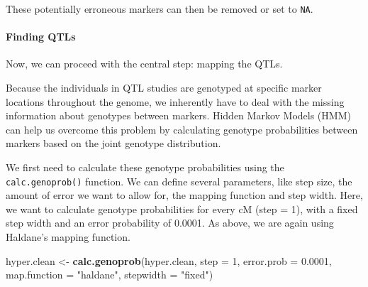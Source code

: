 \documentclass[12pt,]{krantz}
\newenvironment{Shaded}{\begin{snugshade}}{\end{snugshade}}
\newcommand{\KeywordTok}[1]{\textcolor[rgb]{0.27,0.27,0.27}{\textbf{#1}}}
\newcommand{\DataTypeTok}[1]{\textcolor[rgb]{0.27,0.27,0.27}{#1}}
\newcommand{\DecValTok}[1]{\textcolor[rgb]{0.06,0.06,0.06}{#1}}
\newcommand{\FloatTok}[1]{\textcolor[rgb]{0.06,0.06,0.06}{#1}}
\newcommand{\StringTok}[1]{\textcolor[rgb]{0.5,0.5,0.5}{#1}}
\newcommand{\OtherTok}[1]{\textcolor[rgb]{0.56,0.35,0.01}{#1}}
\newcommand{\ControlFlowTok}[1]{\textcolor[rgb]{0.13,0.29,0.53}{\textbf{#1}}}
\newcommand{\OperatorTok}[1]{\textcolor[rgb]{0.81,0.36,0.00}{\textbf{#1}}}
\newcommand{\NormalTok}[1]{#1}
\let\oldparagraph\paragraph
\renewcommand{\paragraph}[1]{\oldparagraph{#1}\mbox{}}
\theoremstyle{definition}
\theoremstyle{definition}
\theoremstyle{definition}
\theoremstyle{remark}
\begin{document}
These potentially erroneous markers can then be removed or set to
\texttt{NA}.

\begin{Shaded}
\end{Shaded}

\paragraph{Finding QTLs}\label{finding-qtls}

Now, we can proceed with the central step: mapping the QTLs.

Because the individuals in QTL studies are genotyped at specific marker
locations throughout the genome, we inherently have to deal with the
missing information about genotypes between markers. Hidden Markov
Models (HMM) can help us overcome this problem by calculating genotype
probabilities between markers based on the joint genotype distribution.

We first need to calculate these genotype probabilities using the
\texttt{calc.genoprob()} function. We can define several parameters,
like step size, the amount of error we want to allow for, the mapping
function and step width. Here, we want to calculate genotype
probabilities for every cM (step = 1), with a fixed step width and an
error probability of 0.0001. As above, we are again using Haldane's
mapping function.

\begin{Shaded}
\begin{Highlighting}[]
\NormalTok{hyper.clean <-}\StringTok{ }\KeywordTok{calc.genoprob}\NormalTok{(hyper.clean, }\DataTypeTok{step =} \DecValTok{1}\NormalTok{, }
                             \DataTypeTok{error.prob =} \FloatTok{0.0001}\NormalTok{, }
                             \DataTypeTok{map.function =} \StringTok{"haldane"}\NormalTok{, }
                             \DataTypeTok{stepwidth =} \StringTok{"fixed"}\NormalTok{)}
\end{Highlighting}
\end{Shaded}
\end{document}
